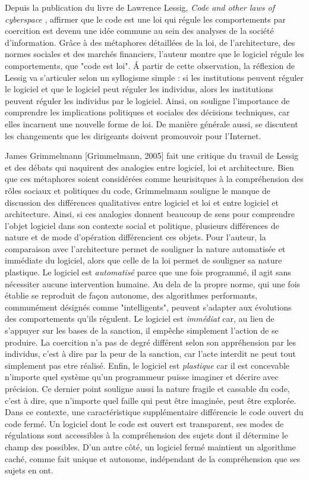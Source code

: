 Depuis la publication du livre de Lawrence Lessig, \emph{Code and other laws of cyberspace} \citep{Lessig1999}, affirmer que le code est une loi qui régule les comportements par coercition est devenu une idée commune au sein des analyses de la société d'information. Grâce à des métaphores détaillées de la loi, de l'architecture, des normes sociales et des marchés financiers, l'auteur montre que le logiciel régule les comportements, que "code est loi". \' A partir de cette observation, la réflexion de Lessig va s'articuler selon un syllogisme simple : si les institutions peuvent réguler le logiciel et que le logiciel peut réguler les individus, alors les institutions peuvent réguler les individus par le logiciel. Ainsi, on souligne l'importance de comprendre les implications politiques et sociales des décisions techniques, car elles incarnent une nouvelle forme de loi. De manière générale aussi, se discutent les changements que les dirigeants doivent promouvoir pour l'Internet.

James Grimmelmann [Grimmelmann, 2005] fait une critique du travail de Lessig et des débats qui naquirent des analogies entre logiciel, loi et architecture. Bien que ces métaphores soient considérées comme heurisitques à la compréhension des rôles sociaux et politiques du code, Grimmelmann souligne le manque de discussion des différences qualitatives entre logiciel et loi et entre logiciel et architecture. Ainsi, si ces analogies donnent beaucoup de sens pour comprendre l'objet logiciel dans son contexte social et politique, plusieurs différences de nature et de mode d'opération différencient ces objets. Pour l'auteur, la comparaison avec l'architecture permet de souligner la nature automatisée et immédiate du logiciel, alors que celle de la loi permet de souligner sa nature plastique. Le logiciel est \emph{automatisé} parce que une fois programmé, il agit sans nécessiter aucune intervention humaine. Au dela de la propre norme, qui une fois établie se reproduit de façon autonome, des algorithmes performants, communément désignés comme "intelligents", peuvent s'adapter aux évolutions des comportements qu'ils régulent. Le logiciel est \emph{immédiat} car, au lieu de s'appuyer sur les bases de la sanction, il empêche simplement l'action de se produire. La coercition n'a pas de degré différent selon son appréhension par les individus, c'est à dire par la peur de la sanction, car l'acte interdit ne peut tout simplement pas etre réalisé. Enfin, le logiciel est \emph{plastique} car il est concevable n'importe quel système qu'un programmeur puisse imaginer et décrire avec précision. Ce dernier point souligne aussi la nature fragile et cassable du code, c'est à dire, que n'importe quel faille qui peut être imaginée, peut être explorée. Dans ce contexte, une caractéristique supplémentaire différencie le code ouvert du code fermé. Un logiciel dont le code est ouvert est transparent, ses modes de régulations sont accessibles à la compréhension des sujets dont il détermine le champ des possibles. D'un autre côté, un logiciel fermé maintient un algorithme caché, comme fait unique et autonome, indépendant de la compréhension que ses sujets en ont.

